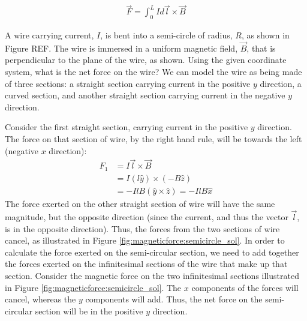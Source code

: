 \begin{align*}
\vec F = \int_0^L I d\vec l \times \vec B
\end{align*}
\begin{example}{\label{ex:magneticforce:semicircle}A wire carrying current, $I$, is bent into a semi-circle of radius, $R$, as shown in Figure REF. The wire is immersed in a uniform magnetic field, $\vec B$, that is perpendicular to the plane of the wire, as shown. Using the given coordinate system, what is the net force on the wire? }
We can model the wire as being made of three sections: a straight section carrying current in the positive $y$ direction, a curved section, and another straight section carrying current in the negative $y$ direction.

Consider the first straight section, carrying current in the positive $y$ direction. The force on that section of wire, by the right hand rule, will be towards the left (negative $x$ direction):
\begin{align*}
F_1 &= I \vec l \times \vec B\\
&= I (l\hat y) \times (-B\hat z)\\
&= -IlB (\hat y \times \hat z)=-IlB\hat x
\end{align*}
The force exerted on the other straight section of wire will have the same magnitude, but the opposite direction (since the current, and thus the vector $\vec l$, is in the opposite direction). Thus, the forces from the two sections of wire cancel, as illustrated in Figure \ref{fig:magneticforce:semicircle_sol}.
In order to calculate the force exerted on the semi-circular section, we need to add together the forces exerted on the infinitesimal sections of the wire that make up that section. Consider the magnetic force on the two infinitesimal sections illustrated in Figure \ref{fig:magneticforce:semicircle_sol}. The $x$ components of the forces will cancel, whereas the $y$ components will add. Thus, the net force on the semi-circular section will be in the positive $y$ direction.


\end{example}
